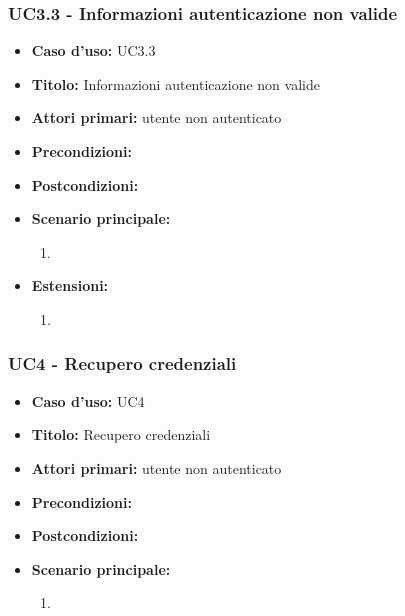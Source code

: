 \documentclass[casi-duso]{subfiles}
\begin{document}
\subsubsection{UC3.3 - Informazioni autenticazione non valide}
\label{subsub:uc3.3utente}
\begin{itemize}
  \item \textbf{Caso d’uso:} UC3.3 
  \item \textbf{Titolo:} Informazioni autenticazione non valide
  \item \textbf{Attori primari:} utente non autenticato
  \item \textbf{Precondizioni:} 
  \item \textbf{Postcondizioni:}
  \item \textbf{Scenario principale:} 
  \begin{enumerate}
    \item 
  \end{enumerate}  
  \item \textbf{Estensioni:} 
  \begin{enumerate}
    \item 
  \end{enumerate}  
\end{itemize}

\subsubsection{UC4 - Recupero credenziali}
\label{subsub:uc4utente}
\begin{itemize}
  \item \textbf{Caso d’uso:} UC4 
  \item \textbf{Titolo:} Recupero credenziali
  \item \textbf{Attori primari:} utente non autenticato
  \item \textbf{Precondizioni:} 
  \item \textbf{Postcondizioni:}
  \item \textbf{Scenario principale:} 
  \begin{enumerate}
    \item 
  \end{enumerate} 
\end{itemize}

\end{document}

